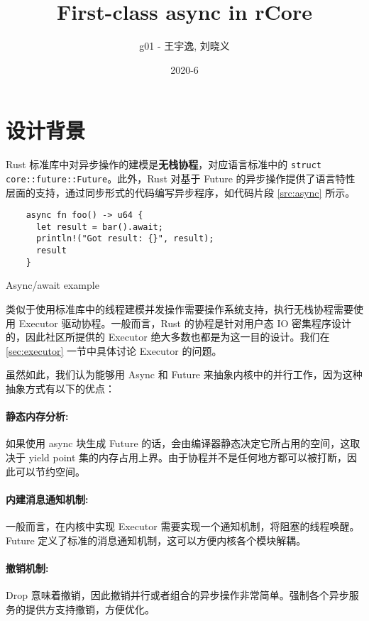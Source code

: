 \documentclass[UTF-8]{ctexart}
\title{First-class async in rCore}
\author{g01 - 王宇逸, 刘晓义}
\date{2020-6}
\begin{document}
\maketitle

\section{设计背景}
Rust 标准库中对异步操作的建模是\textbf{无栈协程}，对应语言标准中的 \texttt{struct core::future::Future}。此外，Rust 对基于 Future 的异步操作提供了语言特性层面的支持，通过同步形式的代码编写异步程序，如代码片段 \ref{src:async} 所示。

\begin{listing}[H]
    \begin{verbatim}
    async fn foo() -> u64 {
      let result = bar().await;
      println!("Got result: {}", result);
      result
    }
  \end{verbatim}
    \caption{Async/await example}
    \label{src:async}
\end{listing}

类似于使用标准库中的线程建模并发操作需要操作系统支持，执行无栈协程需要使用 Executor 驱动协程。一般而言，Rust 的协程是针对用户态 IO 密集程序设计的，因此社区所提供的 Executor 绝大多数也都是为这一目的设计。我们在 \ref{sec:executor} 一节中具体讨论 Executor 的问题。

虽然如此，我们认为能够用 Async 和 Future 来抽象内核中的并行工作，因为这种抽象方式有以下的优点：

\paragraph{静态内存分析:} 如果使用 async 块生成 Future 的话，会由编译器静态决定它所占用的空间，这取决于 yield point 集的内存占用上界。由于协程并不是任何地方都可以被打断，因此可以节约空间。

\paragraph{内建消息通知机制:} 一般而言，在内核中实现 Executor 需要实现一个通知机制，将阻塞的线程唤醒。Future 定义了标准的消息通知机制，这可以方便内核各个模块解耦。

\paragraph{撤销机制:} Drop 意味着撤销，因此撤销并行或者组合的异步操作非常简单。强制各个异步服务的提供方支持撤销，方便优化。
\end{document}
